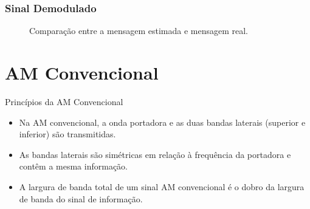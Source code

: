 \documentclass[10pt,hyperref={pdfpagemode=FullScreen},aspectratio=169]{beamer}
\begin{document}
\begin{frame}
  \frametitle{Sinal Demodulado}

  \begin{figure}[h!]
    \begin{center}
      \caption{Comparação entre a mensagem estimada e mensagem real.}
    \end{center}
  \end{figure}

\end{frame}


\section{AM Convencional}

\begin{frame}{Princípios da AM Convencional}
  
  \begin{itemize}
      \item Na AM convencional, a onda portadora e as duas bandas laterais (superior e inferior) são transmitidas.
      \item As bandas laterais são simétricas em relação à frequência da portadora e contêm a mesma informação.
      \item A largura de banda total de um sinal AM convencional é o dobro da largura de banda do sinal de informação.
  \end{itemize}
\end{frame}
 
\end{document}
